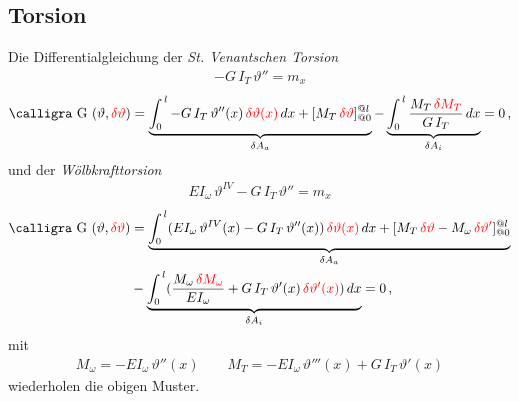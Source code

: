 {{{{{\textcolor{sectionTitleBlue}{\subsection{Torsion}}}
Die Differentialgleichung der {\em St. Venantschen Torsion\/}
\begin{align}
- G\,I_T\,\vartheta '' = m_x
\end{align}
\begin{align}
\text{\normalfont\calligra G\,\,}(\vartheta,\textcolor{red}{\delta \vartheta}) = \underbrace{\int_0^{\,l} -  G\,I_T\,\vartheta''(x)\,\textcolor{red}{\delta \vartheta(x)}\,dx + [M_T\,\textcolor{red}{\delta \vartheta}]_{@0}^{@l}}_{\delta A_a} - \underbrace{\int_0^{\,l} \frac{M_T\,\textcolor{red}{\delta M_T}}{G\,I_T}\,dx}_{\delta A_i} = 0\,,
\end{align}
und der {\em W\"{o}lbkrafttorsion\/}
\begin{align}
EI_\omega\,\vartheta^{IV} - G\,I_T\,\vartheta'' = m_x
\end{align}
\begin{align}
\text{\normalfont\calligra G\,\,}(\vartheta,\textcolor{red}{\delta \vartheta}) &= \underbrace{\int_0^{\,l} (EI_\omega\,\vartheta^{IV}(x) - G\,I_T\,\vartheta''(x))\,\textcolor{red}{\delta \vartheta(x)}\,dx + [M_T\,\textcolor{red}{\delta \vartheta} - M_\omega\,\textcolor{red}{\delta \vartheta'}]_{@0}^{@l}}_{\delta A_a} \nn  \\
&- \underbrace{\int_0^{\,l}(\frac{M_\omega\,\textcolor{red}{\delta M_\omega}}{EI_\omega} + G\,I_T\,\vartheta'(x)\,\textcolor{red}{\delta \vartheta'(x)})\,dx}_{\delta A_i} = 0\,,
\end{align}
mit
\begin{align}
M_\omega = - EI_\omega\,\vartheta''(x) \qquad M_T = - EI_\omega\,\vartheta'''(x) + G\,I_T\,\vartheta'(x)
\end{align}
wiederholen die obigen Muster.

}}}}
